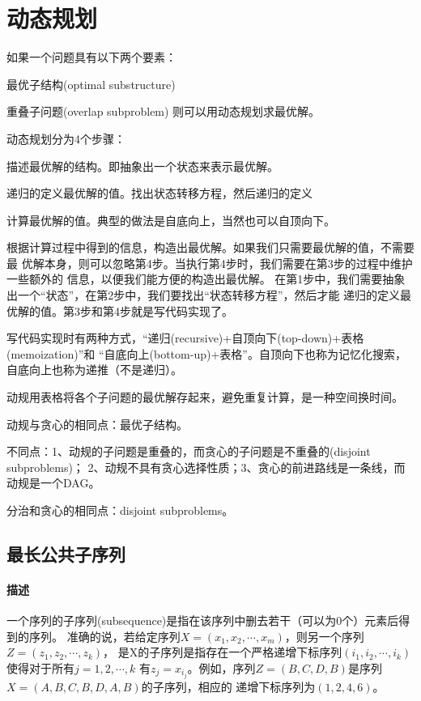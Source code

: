 \chapter{动态规划}
如果一个问题具有以下两个要素：
\begindot
\item 最优子结构(optimal substructure)
\item 重叠子问题(overlap subproblem)
\myenddot
则可以用动态规划求最优解。

动态规划分为4个步骤：
\begindot
\item 描述最优解的结构。即抽象出一个状态来表示最优解。
\item 递归的定义最优解的值。找出状态转移方程，然后递归的定义
\item 计算最优解的值。典型的做法是自底向上，当然也可以自顶向下。
\item 根据计算过程中得到的信息，构造出最优解。如果我们只需要最优解的值，不需要最
优解本身，则可以忽略第4步。当执行第4步时，我们需要在第3步的过程中维护一些额外的
信息，以便我们能方便的构造出最优解。
\myenddot
在第1步中，我们需要抽象出一个“状态”，在第2步中，我们要找出“状态转移方程”，然后才能
递归的定义最优解的值。第3步和第4步就是写代码实现了。

写代码实现时有两种方式，“递归(recursive)+自顶向下(top-down)+表格(memoization)”和
“自底向上(bottom-up)+表格”。自顶向下也称为记忆化搜索，自底向上也称为递推（不是递归）。

动规用表格将各个子问题的最优解存起来，避免重复计算，是一种空间换时间。

动规与贪心的相同点：最优子结构。

不同点：1、动规的子问题是重叠的，而贪心的子问题是不重叠的(disjoint subproblems)；
2、动规不具有贪心选择性质；3、贪心的前进路线是一条线，而动规是一个DAG。

分治和贪心的相同点：disjoint subproblems。


\section{最长公共子序列} %
\subsubsection{描述}
一个序列的子序列(subsequence)是指在该序列中删去若干（可以为0个）元素后得到的序列。
准确的说，若给定序列$X=(x_1,x_2,\cdots,x_m)$，则另一个序列$Z=(z_1,z_2,\cdots,z_k)$，
是X的子序列是指存在一个严格递增下标序列$(i_1,i_2,\cdots,i_k)$使得对于所有$j=1,2,\cdots,k$
有$z_j=x_{i_j}$。例如，序列$Z=(B,C,D,B)$是序列$X=(A,B,C,B,D,A,B)$的子序列，相应的
递增下标序列为$(1,2,4,6)$。

